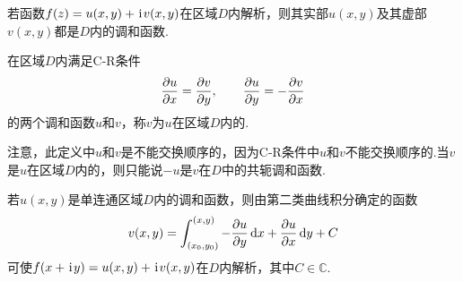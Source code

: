 \begin{theorem}
若函数\(f(z)=u(x,y)+\kern1pt\mathrm{i}\kern1pt v(x,y)\)在区域\(D\)内解析，则其实部\(u(x,y)\)及其虚部\(v(x,y)\)都是\(D\)内的调和函数.
\end{theorem}

\begin{definition}
在区域\(D\)内满足C-R条件\[
\pdv{u}{x}=\pdv{v}{y}, \qquad \pdv{u}{y}=-\pdv{v}{x}
\]的两个调和函数\(u\)和\(v\)，称\(v\)为\(u\)在区域\(D\)内的.
\end{definition}
注意，此定义中\(u\)和\(v\)是不能交换顺序的，因为C-R条件中\(u\)和\(v\)不能交换顺序的.当\(v\)是\(u\)在区域\(D\)内的，则只能说\(-u\)是\(v\)在\(D\)中的共轭调和函数.

\begin{theorem}
若\(u(x,y)\)是单连通区域\(D\)内的调和函数，则由第二类曲线积分确定的函数\[
v(x,y)=\int_{(x_0,y_0)}^{(x,y)}
-\pdv{u}{y} \dd{x} + \pdv{u}{x} \dd{y} + C
\]可使\(f(x+\kern1pt\mathrm{i}\kern1pt y)=u(x,y)+\kern1pt\mathrm{i}\kern1pt v(x,y)\)在\(D\)内解析，其中\(C\in\mathbb{C}\).
\end{theorem}
